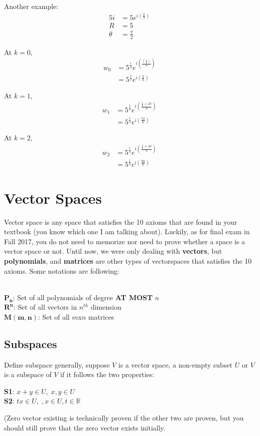 \documentclass[12pt]{article}
\newcommand{\R}{\mathbb{R}}
\begin{document}
Another example:
\begin{align*}
5i &= 5e^{i(\frac{\pi}{2})} \\
R &= 5 \\
\theta &= \frac{\pi}{2}
\end{align*}

At $k=0$, 
\begin{align*}
w_0 &= 5^{\frac{1}{3}} e^{i(\frac{(\frac{\pi}{2})}{3})} \\
&= 5^{\frac{1}{3}} e^{i(\frac{\pi}{6})} 
\end{align*}

At $k=1$, 
\begin{align*}
w_1 &= 5^{\frac{1}{3}} e^{i(\frac{\frac{\pi}{2} + 2\pi}{3})} \\
&= 5^{\frac{1}{3}} e^{i(\frac{5\pi}{6})} 
\end{align*}

At $k=2$, 
\begin{align*}
w_2 &= 5^{\frac{1}{3}} e^{i(\frac{\frac{\pi}{2} + 4\pi}{3})} \\
&= 5^{\frac{1}{3}} e^{i(\frac{9\pi}{6})} 
\end{align*}

\section{Vector Spaces}
Vector space is any space that satisfies the 10 axioms that are found in your textbook (you know which one I am talking about). Luckily, as for final exam in Fall 2017, you do not need to memorize nor need to prove whether a space is a vector space or not. 
Until now, we were only dealing with \textbf{vectors}, but \textbf{polynomials}, and \textbf{matrices} are other types of vectorspaces that satisfies the 10 axioms. Some notations are following: \\\\
\begin{centering}
$\mathbf{P_n}$: Set of all polynomials of degree \textbf{AT MOST} $n$\\
$\mathbf{R^n}$: Set of all vectors in $n^{th}$ dimension\\
$\mathbf{M(m,n)}$: Set of all $m$x$n$ matrices \\
\end{centering}

\subsection{Subspaces}
Define subspace generally, suppose $V$ is a vector space, a non-empty subset  $U$ or $V$ is a subspace of $V$ if it follows the two properties:\\
\begin{centering}
\textbf{S1}: $x + y \in U, \; x,y \in U$\\
\textbf{S2}: $tx \in U, \;, x\in U, t\in\R$\\ 
\end{centering}
(Zero vector existing is technically proven if the other two are proven, but you should still prove that the zero vector exists initially.
\end{document}
